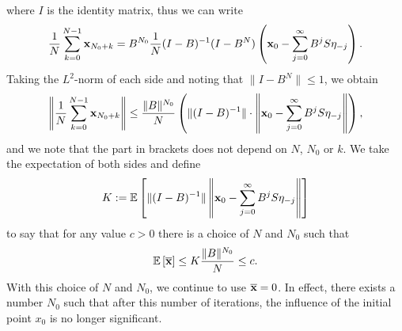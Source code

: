 where $I$ is the identity matrix, thus we can write
\begin{equation}
\frac{1}{N}\sum_{k=0}^{N-1} \mathbf{x}_{N_0+k} =  B^{N_0} \frac{1}{N} (I-B)^{-1}(I-B^N)\left(\mathbf{x}_0 - \sum_{j=0}^{\infty} B^{j} S \mathbf{\eta}_{-j} \right).
\label{eqn:EOF-simplifiedMean}
\end{equation}
Taking the $L^2$-norm of each side and noting that $\|I-B^N\|\leq 1$, we obtain
\begin{equation}
\left\|\frac{1}{N}\sum_{k=0}^{N-1} \mathbf{x}_{N_0+k}\right\| \leq \frac{\|B\|^{N_0}}{N} \left( \|(I-B)^{-1}\|\cdot \left\|\mathbf{x}_0 - \sum_{j=0}^{\infty} B^{j} S \mathbf{\eta}_{-j} \right\| \right),
\end{equation}
and we note that the part in brackets does not depend on $N$, $N_0$ or $k$. We take the expectation of both sides and define
\begin{equation}
K := \mathbb{E}\left[ \|(I-B)^{-1}\| \left\|\mathbf{x}_0 - \sum_{j=0}^{\infty} B^{j} S \mathbf{\eta}_{-j} \right\| \right]
\end{equation}
to say that for any value $c>0$ there is a choice of $N$ and $N_0$ such that
\begin{equation}
\mathbb{E}\left[\overline{\mathbf{x}}\right] \leq K\frac{\|B\|^{N_0}}{N} \leq c.
\end{equation}
With this choice of $N$ and $N_0$, we continue to use $\overline{\mathbf{x}}=0$. In effect, there exists a number $N_0$ such that after this number of iterations, the influence of the initial point $x_0$ is no longer significant. 

